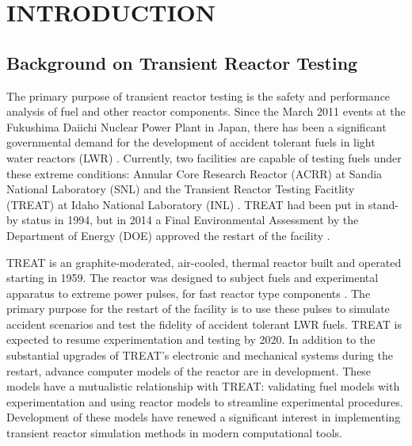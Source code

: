 %
%
%



\pagestyle{plain} %
\setcounter{page}{1}


\chapter{\uppercase{Introduction}}

\section{Background on Transient Reactor Testing}

The primary purpose of transient reactor testing is the safety and performance analysis of fuel and other reactor components. Since the March 2011 events at the Fukushima Daiichi Nuclear Power Plant in Japan, there has been a significant governmental demand for the development of accident tolerant fuels in light water reactors (LWR) \cite{ConRepTREAT}.  Currently, two facilities are capable of testing fuels under these extreme conditions: Annular Core Research Reactor (ACRR) at Sandia National Laboratory (SNL) and the Transient Reactor Testing Facitlity (TREAT) at Idaho National Laboratory (INL) \cite{SandiaTREAT}. TREAT had been put in stand-by status in 1994, but in 2014 a Final Environmental Assessment by the Department of Energy (DOE) approved the restart of the facility \cite{FONSI}. 

TREAT is an graphite-moderated, air-cooled, thermal reactor built and operated starting in 1959.  The reactor was designed to subject fuels and experimental apparatus to extreme power pulses, for fast reactor type components \cite{TREATSummary}. The primary purpose for the restart of the facility is to use these pulses to simulate accident scenarios and test the fidelity of accident tolerant LWR fuels. TREAT is expected to resume experimentation and testing by 2020.  In addition to the substantial upgrades of TREAT's electronic and mechanical systems during the restart, advance computer models of the reactor are in development.  These models have a mutualistic relationship with TREAT: validating fuel models with experimentation and using reactor models to streamline experimental procedures. Development of these models have renewed a significant interest in implementing transient reactor simulation methods in modern computational tools.

